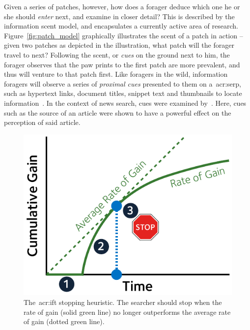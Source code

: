Given a series of patches, however, how does a forager deduce which one he or she should \emph{enter} next, and examine in closer detail? This is described by the information scent model, and encapsulates a currently active area of research. Figure~\ref{fig:patch_model} graphically illustrates the scent of a patch in action -- given two patches as depicted in the illustration, what patch will the forager travel to next? Following the scent, or \emph{cues} on the ground next to him, the forager observes that the paw prints to the first patch are more prevalent, and thus will venture to that patch first. Like foragers in the wild, information foragers will observe a series of \emph{proximal cues} presented to them on a~\gls{acr:serp}, such as hypertext links, document titles, snippet text and thumbnails to locate information~\citep{pirolli1995ift, pirolli1999ift, chi2001information_scent, oltston2003scenttrails, pirolli2007ift}. In the context of news search, cues were examined by~\cite{sundar2007news_scent}. Here, cues such as the source of an article were shown to have a powerful effect on the perception of said article.

\begin{figure}
    \begin{center}
    \vspace*{-10mm}
    \includegraphics[width=1\textwidth]{figures/ch3-ift_stop.pdf}
    \end{center}
    \vspace*{-4mm}
    \caption[\gls{acr:ift} Stopping Heuristic]{The~\gls{acr:ift} stopping heuristic. The searcher should stop when the rate of gain (solid {\color{dmax_green}green} line) no longer outperforms the average rate of gain (dotted {\color{dmax_green}green} line).}
    \label{fig:ift_stopping}
\end{figure}

